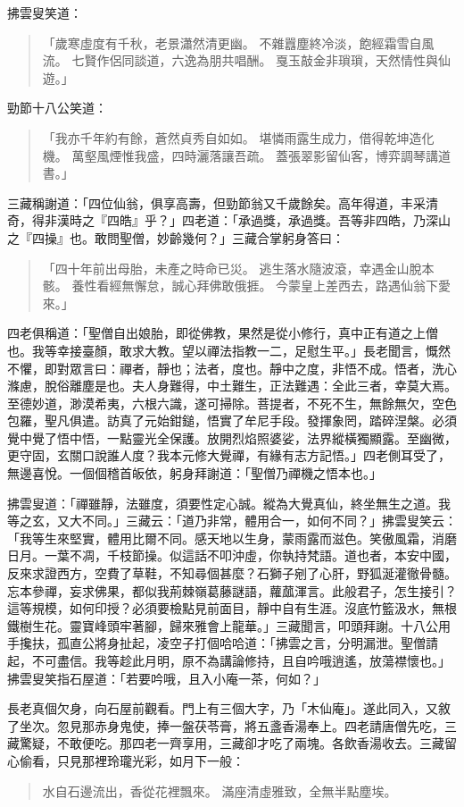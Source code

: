 拂雲叟笑道：
\begin{quote}
「歲寒虛度有千秋，老景瀟然清更幽。
不雜囂塵終冷淡，飽經霜雪自風流。
七賢作侶同談道，六逸為朋共唱酬。
戛玉敲金非瑣瑣，天然情性與仙遊。」
\end{quote}

勁節十八公笑道：
\begin{quote}
「我亦千年約有餘，蒼然貞秀自如如。
堪憐雨露生成力，借得乾坤造化機。
萬壑風煙惟我盛，四時灑落讓吾疏。
蓋張翠影留仙客，博弈調琴講道書。」
\end{quote}

三藏稱謝道：「四位仙翁，俱享高壽，但勁節翁又千歲餘矣。高年得道，丰采清奇，得非漢時之『四皓』乎？」四老道：「承過獎，承過獎。吾等非四皓，乃深山之『四操』也。敢問聖僧，妙齡幾何？」三藏合掌躬身答曰：
\begin{quote}
「四十年前出母胎，未產之時命已災。
逃生落水隨波滾，幸遇金山脫本骸。
養性看經無懈怠，誠心拜佛敢俄捱。
今蒙皇上差西去，路遇仙翁下愛來。」
\end{quote}

四老俱稱道：「聖僧自出娘胎，即從佛教，果然是從小修行，真中正有道之上僧也。我等幸接臺顏，敢求大教。望以禪法指教一二，足慰生平。」長老聞言，慨然不懼，即對眾言曰：禪者，靜也；法者，度也。靜中之度，非悟不成。悟者，洗心滌慮，脫俗離塵是也。夫人身難得，中土難生，正法難遇：全此三者，幸莫大焉。至德妙道，渺漠希夷，六根六識，遂可掃除。菩提者，不死不生，無餘無欠，空色包羅，聖凡俱遣。訪真了元始鉗鎚，悟實了牟尼手段。發揮象罔，踏碎涅槃。必須覺中覺了悟中悟，一點靈光全保護。放開烈焰照婆娑，法界縱橫獨顯露。至幽微，更守固，玄關口說誰人度？我本元修大覺禪，有緣有志方記悟。」四老側耳受了，無邊喜悅。一個個稽首皈依，躬身拜謝道：「聖僧乃禪機之悟本也。」

拂雲叟道：「禪雖靜，法雖度，須要性定心誠。縱為大覺真仙，終坐無生之道。我等之玄，又大不同。」三藏云：「道乃非常，體用合一，如何不同？」拂雲叟笑云：「我等生來堅實，體用比爾不同。感天地以生身，蒙雨露而滋色。笑傲風霜，消磨日月。一葉不凋，千枝節操。似這話不叩沖虛，你執持梵語。道也者，本安中國，反來求證西方，空費了草鞋，不知尋個甚麼？石獅子剜了心肝，野狐涎灌徹骨髓。忘本參禪，妄求佛果，都似我荊棘嶺葛藤謎語，蘿蓏渾言。此般君子，怎生接引？這等規模，如何印授？必須要檢點見前面目，靜中自有生涯。沒底竹籃汲水，無根鐵樹生花。靈寶峰頭牢著腳，歸來雅會上龍華。」三藏聞言，叩頭拜謝。十八公用手攙扶，孤直公將身扯起，凌空子打個哈哈道：「拂雲之言，分明漏泄。聖僧請起，不可盡信。我等趁此月明，原不為講論修持，且自吟哦逍遙，放蕩襟懷也。」拂雲叟笑指石屋道：「若要吟哦，且入小庵一茶，何如？」

長老真個欠身，向石屋前觀看。門上有三個大字，乃「木仙庵」。遂此同入，又敘了坐次。忽見那赤身鬼使，捧一盤茯苓膏，將五盞香湯奉上。四老請唐僧先吃，三藏驚疑，不敢便吃。那四老一齊享用，三藏卻才吃了兩塊。各飲香湯收去。三藏留心偷看，只見那裡玲瓏光彩，如月下一般：
\begin{quote}
水自石邊流出，香從花裡飄來。
滿座清虛雅致，全無半點塵埃。
\end{quote}

